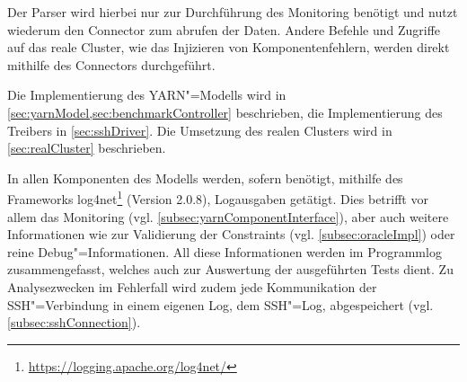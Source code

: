 Der Parser wird hierbei nur zur Durchführung des Monitoring benötigt und nutzt wiederum den Connector zum abrufen der Daten.
Andere Befehle und Zugriffe auf das reale Cluster, wie \zB das Injizieren von Komponentenfehlern, werden direkt mithilfe des Connectors durchgeführt.

Die Implementierung des \gls{YARN}"=Modells wird in \cref{sec:yarnModel,sec:benchmarkController} beschrieben, die Implementierung des Treibers in \cref{sec:sshDriver}.
Die Umsetzung des realen Clusters wird in \cref{sec:realCluster} beschrieben.

In allen Komponenten des Modells werden, sofern benötigt, mithilfe des Frameworks log4net\footnote{\url{https://logging.apache.org/log4net/}} (Version 2.0.8), Logausgaben getätigt.
Dies betrifft vor allem das Monitoring (vgl. \cref{subsec:yarnComponentInterface}), aber auch weitere Informationen wie zur Validierung der Constraints (vgl. \cref{subsec:oracleImpl}) oder reine Debug"=Informationen.
All diese Informationen werden im Programmlog zusammengefasst, welches auch zur Auswertung der ausgeführten \glspl{Test} dient.
Zu Analysezwecken im Fehlerfall wird zudem jede Kommunikation der SSH"=Verbindung in einem eigenen Log, dem SSH"=Log, abgespeichert (vgl. \cref{subsec:sshConnection}).
